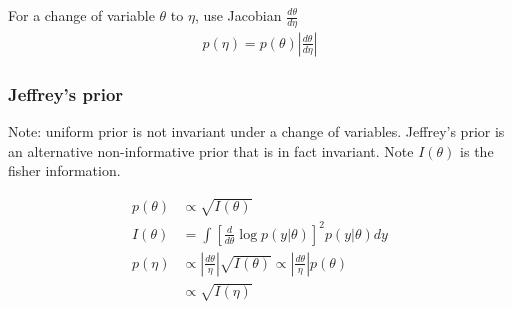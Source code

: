     For a change of variable $\theta$ to $\eta$, use
    Jacobian $\frac{d\theta}{d\eta}$
    \begin{align*}
        p(\eta) = p(\theta)\left|
        \frac{d\theta}{d\eta}
        \right|
    \end{align*}

    \subsubsection{Jeffrey's prior}

    Note: uniform prior is not invariant under a change of
    variables. Jeffrey's prior is an alternative
    non-informative prior that is in fact invariant. Note
    $I(\theta)$ is the fisher information.

    \begin{align*}
        p(\theta) &\propto \sqrt{I(\theta)}\\
        I(\theta) &= \int \left[
            \frac{d}{d\theta} \log p(y|\theta)
        \right]^2
        p(y|\theta)dy\\
            p(\eta) &\propto
            \left|\frac{d\theta}{\eta}\right|
            \sqrt{I(\theta)}
            \propto
            \left|\frac{d\theta}{\eta}\right|p(\theta)\\
                    &\propto \sqrt{I(\eta)}
    \end{align*}
